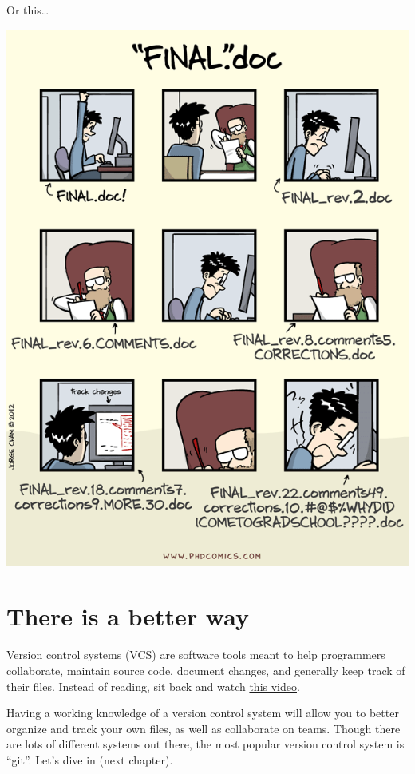 \documentclass[
]{book}
\begin{document}
Or this\ldots{}

\includegraphics{img/version_control_2.png}

\hypertarget{there-is-a-better-way}{%
\chapter*{There is a better way}\label{there-is-a-better-way}}

Version control systems (VCS) are software tools meant to help programmers collaborate, maintain source code, document changes, and generally keep track of their files. Instead of reading, sit back and watch \href{https://youtu.be/9GKpbI1siow}{this video}.

Having a working knowledge of a version control system will allow you to better organize and track your own files, as well as collaborate on teams. Though there are lots of different systems out there, the most popular version control system is ``git''. Let's dive in (next chapter).
\end{document}
